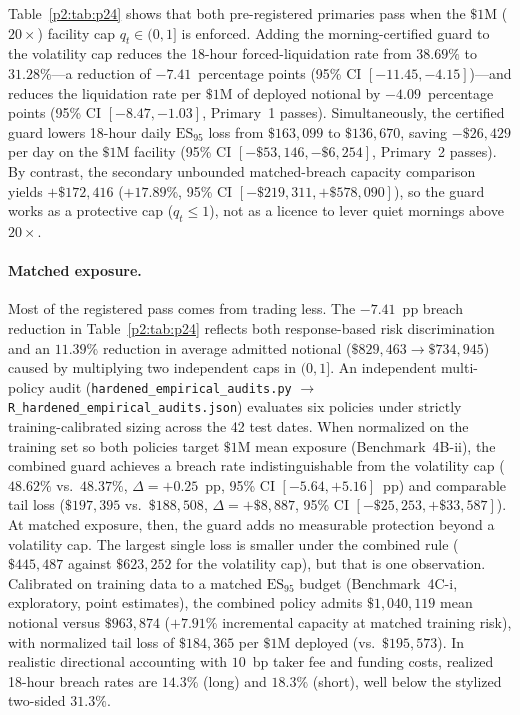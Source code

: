 Table~\ref{p2:tab:p24} shows that both pre-registered primaries pass when the $\$1\text{M}$ ($20\times$) facility cap $q_t\in(0,1]$ is enforced. Adding the morning-certified guard to the volatility cap reduces the 18-hour forced-liquidation rate from $38.69\%$ to $31.28\%$---a reduction of $-7.41$~percentage points (95\% CI $[-11.45,-4.15]$)---and reduces the liquidation rate per $\$1\text{M}$ of deployed notional by $-4.09$~percentage points (95\% CI $[-8.47,-1.03]$, Primary~1 passes). Simultaneously, the certified guard lowers 18-hour daily $\mathrm{ES}_{95}$ loss from $\$163{,}099$ to $\$136{,}670$, saving $-\$26{,}429$ per day on the $\$1\text{M}$ facility (95\% CI $[-\$53{,}146,-\$6{,}254]$, Primary~2 passes). By contrast, the secondary unbounded matched-breach capacity comparison yields $+\$172{,}416$ ($+17.89\%$, 95\% CI $[-\$219{,}311,+\$578{,}090]$), so the guard works as a protective cap ($q_t\le 1$), not as a licence to lever quiet mornings above $20\times$.

\paragraph{Matched exposure.} Most of the registered pass comes from trading less. The $-7.41$~pp breach reduction in Table~\ref{p2:tab:p24} reflects both response-based risk discrimination and an $11.39\%$ reduction in average admitted notional ($\$829{,}463 \to \$734{,}945$) caused by multiplying two independent caps in $(0,1]$. An independent multi-policy audit (\texttt{hardened\_empirical\_audits.py} $\to$ \texttt{R\_hardened\_empirical\_audits.json}) evaluates six policies under strictly training-calibrated sizing across the 42 test dates. When normalized on the training set so both policies target $\$1\text{M}$ mean exposure (Benchmark~4B-ii), the combined guard achieves a breach rate indistinguishable from the volatility cap ($48.62\%$ vs.\ $48.37\%$, $\Delta=+0.25$~pp, 95\% CI $[-5.64,+5.16]$~pp) and comparable tail loss ($\$197{,}395$ vs.\ $\$188{,}508$, $\Delta=+\$8{,}887$, 95\% CI $[-\$25{,}253,+\$33{,}587]$). At matched exposure, then, the guard adds no measurable protection beyond a volatility cap. The largest single loss is smaller under the combined rule ($\$445{,}487$ against $\$623{,}252$ for the volatility cap), but that is one observation. Calibrated on training data to a matched $\mathrm{ES}_{95}$ budget (Benchmark~4C-i, exploratory, point estimates), the combined policy admits $\$1{,}040{,}119$ mean notional versus $\$963{,}874$ ($+7.91\%$ incremental capacity at matched training risk), with normalized tail loss of $\$184{,}365$ per $\$1\text{M}$ deployed (vs.\ $\$195{,}573$). In realistic directional accounting with $10$~bp taker fee and funding costs, realized 18-hour breach rates are $14.3\%$ (long) and $18.3\%$ (short), well below the stylized two-sided $31.3\%$.

